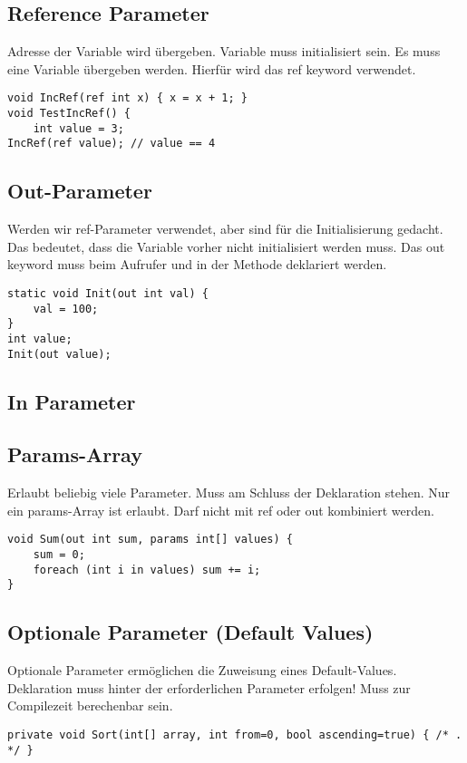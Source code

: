 \subsection{Reference Parameter}
Adresse der Variable wird übergeben. Variable muss initialisiert sein. Es muss eine Variable übergeben werden. Hierfür wird das ref keyword verwendet.
\begin{lstlisting}
void IncRef(ref int x) { x = x + 1; } 
void TestIncRef() {
	int value = 3;
IncRef(ref value); // value == 4
\end{lstlisting}

\subsection{Out-Parameter}
Werden wir ref-Parameter verwendet, aber sind für die Initialisierung gedacht. Das bedeutet, dass die Variable vorher nicht initialisiert werden muss. Das out keyword muss beim Aufrufer und in der Methode deklariert werden.
\begin{lstlisting}
static void Init(out int val) {
	val = 100;
}
int value;
Init(out value);	
\end{lstlisting}

\subsection{In Parameter}



\subsection{Params-Array}
Erlaubt beliebig viele Parameter. Muss am Schluss der Deklaration stehen. Nur ein params-Array ist erlaubt. Darf nicht mit ref oder out kombiniert werden.
\begin{lstlisting}
void Sum(out int sum, params int[] values) {
	sum = 0;
	foreach (int i in values) sum += i; 
} 
\end{lstlisting}

\subsection{Optionale Parameter (Default Values)}
Optionale Parameter ermöglichen die Zuweisung eines Default-Values. Deklaration muss hinter der erforderlichen Parameter erfolgen! Muss zur Compilezeit berechenbar sein.
\begin{lstlisting}
private void Sort(int[] array, int from=0, bool ascending=true) { /* . */ }
\end{lstlisting}

